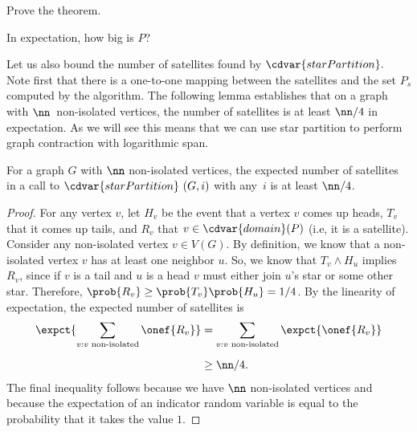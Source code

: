 \begin{exercise}
Prove the theorem.
\end{exercise}

\begin{teachask}
 In expectation, how big is $P$?  
\end{teachask}


\begin{gram}
\label{graphcon::star::partition::analysis::nsat}

Let us also bound the number of satellites found by
$\cdvar{starPartition}.$
%
Note first that there is a one-to-one mapping between the satellites
and the set $P_s$ computed by  the algorithm.
%
%
The following lemma establishes that on a graph with
$\nn$~non-isolated vertices, the number of satellites is at least
$\nn/4$ in expectation.
%
As we will see this means that we can use star partition to perform
graph contraction with logarithmic span.
\end{gram}

\begin{flex}
\begin{lemma}
\label{lem:graphcon::star::partition::analysis::satellites}
  For a graph $G$ with $\nn$ non-isolated vertices, the expected
  number of satellites in a call to $\cdvar{starPartition}~(G,i)$ with
  any~$i$ is at least $\nn/4$.
\end{lemma}

\begin{proof}
  For any vertex $v$, let $H_v$ be the event that a vertex $v$ comes
  up heads, $T_v$ that it comes up tails, and $R_v$ that $v \in
  \cdvar{domain}(P)$ (i.e, it is a satellite).
%
  Consider any non-isolated vertex $v \in V(G)$.  By definition, we
  know that a non-isolated vertex $v$ has at least one neighbor $u$.
  So, we know that $T_v \land H_u$ implies $R_v$, since if $v$ is a
  tail and $u$ is a head $v$ must either join $u$'s star or some other
  star.  Therefore, $\prob{R_v} \geq \prob{T_v} \prob{H_u} = 1/4$.  By
  the linearity of expectation,  the expected number of satellites is
  \begin{align*}
    \expct{\sum_{v: v \text{ non-isolated}} \onef{R_v}} & = \sum_{v: v
      \text{ non-isolated}} \expct{\onef{R_v}} 
\\[2mm]
  & \geq \nn/4.
  \end{align*}
  The final inequality follows because we have $\nn$ non-isolated
  vertices and because the expectation of an indicator random variable
  is equal to the probability that it takes the value $1$.
\end{proof}
\end{flex}


